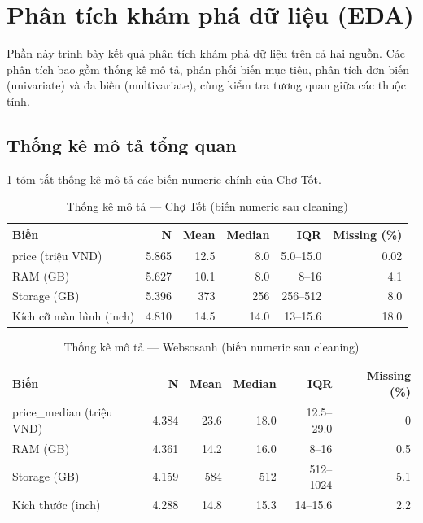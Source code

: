 \section{Phân tích khám phá dữ liệu (EDA)}
\label{sec:eda}

Phần này trình bày kết quả phân tích khám phá dữ liệu\cite{tukey1977eda} trên cả hai nguồn. Các phân tích bao gồm thống kê mô tả, phân phối biến mục tiêu, phân tích đơn biến (univariate) và đa biến (multivariate), cùng kiểm tra tương quan giữa các thuộc tính.

\subsection{Thống kê mô tả tổng quan}

\cref{tab:descriptive-chotot} tóm tắt thống kê mô tả các biến numeric chính của Chợ Tốt.

\begin{table}[H]
    \centering
    \caption{Thống kê mô tả --- Chợ Tốt (biến numeric sau cleaning)}
    \label{tab:descriptive-chotot}
    \begin{tabular}{lrrrrr}
        \toprule
        \textbf{Biến} & \textbf{N} & \textbf{Mean} & \textbf{Median} & \textbf{IQR} & \textbf{Missing (\%)} \\
        \midrule
        price (triệu VND)     & 5.865 & 12.5 & 8.0 & 5.0--15.0 & 0.02 \\
        RAM (GB)               & 5.627 & 10.1 & 8.0 & 8--16 & 4.1 \\
        Storage (GB)           & 5.396 & 373  & 256 & 256--512 & 8.0 \\
        Kích cỡ màn hình (inch) & 4.810 & 14.5 & 14.0 & 13--15.6 & 18.0 \\
        \bottomrule
    \end{tabular}
\end{table}

\begin{table}[H]
    \centering
    \caption{Thống kê mô tả --- Websosanh (biến numeric sau cleaning)}
    \label{tab:descriptive-websach}
    \begin{tabular}{lrrrrr}
        \toprule
        \textbf{Biến} & \textbf{N} & \textbf{Mean} & \textbf{Median} & \textbf{IQR} & \textbf{Missing (\%)} \\
        \midrule
        price\_median (triệu VND) & 4.384 & 23.6 & 18.0 & 12.5--29.0 & 0 \\
        RAM (GB)                   & 4.361 & 14.2 & 16.0 & 8--16 & 0.5 \\
        Storage (GB)               & 4.159 & 584  & 512 & 512--1024 & 5.1 \\
        Kích thước (inch)          & 4.288 & 14.8 & 15.3 & 14--15.6 & 2.2 \\
        \bottomrule
    \end{tabular}
\end{table}

